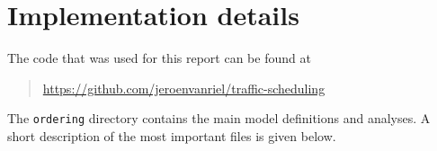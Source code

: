 \documentclass[a4paper]{article}
\theoremstyle{definition}
\theoremstyle{plain}
\begin{document}
%

\newpage

\section*{Implementation details}

The code that was used for this report can be found at
\begin{quote}
\url{https://github.com/jeroenvanriel/traffic-scheduling}
\end{quote}
The \texttt{ordering} directory contains the main model definitions and analyses.
A short description of the most important files is given below.
\end{document}
